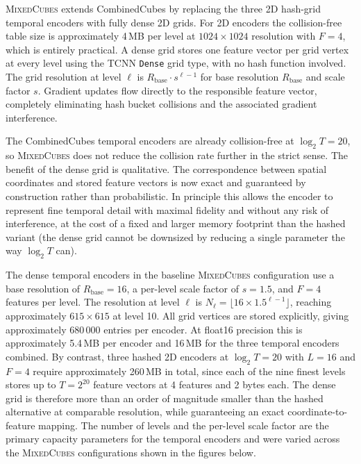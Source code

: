 \documentclass[12pt, a4paper, twoside]{report}
\newcommand{\MixedCubes}{\textsc{MixedCubes}}
\begin{document}
\MixedCubes{} extends CombinedCubes by replacing the three 2D hash-grid temporal encoders with fully dense 2D grids. For 2D encoders the collision-free table size is approximately 4\,MB per level at $1024 \times 1024$ resolution with $F = 4$, which is entirely practical. A dense grid stores one feature vector per grid vertex at every level using the TCNN \texttt{Dense} grid type, with no hash function involved. The grid resolution at level $\ell$ is $R_\text{base} \cdot s^{\ell-1}$ for base resolution $R_\text{base}$ and scale factor $s$. Gradient updates flow directly to the responsible feature vector, completely eliminating hash bucket collisions and the associated gradient interference.

The CombinedCubes temporal encoders are already collision-free at $\log_2 T = 20$, so \MixedCubes{} does not reduce the collision rate further in the strict sense. The benefit of the dense grid is qualitative. The correspondence between spatial coordinates and stored feature vectors is now exact and guaranteed by construction rather than probabilistic. In principle this allows the encoder to represent fine temporal detail with maximal fidelity and without any risk of interference, at the cost of a fixed and larger memory footprint than the hashed variant (the dense grid cannot be downsized by reducing a single parameter the way $\log_2 T$ can).

The dense temporal encoders in the baseline \MixedCubes{} configuration use a base resolution of $R_\text{base} = 16$, a per-level scale factor of $s = 1.5$, and $F = 4$ features per level. The resolution at level $\ell$ is $N_\ell = \lfloor 16 \times 1.5^{\ell-1} \rfloor$, reaching approximately $615 \times 615$ at level 10. All grid vertices are stored explicitly, giving approximately 680\,000 entries per encoder. At float16 precision this is approximately 5.4\,MB per encoder and 16\,MB for the three temporal encoders combined. By contrast, three hashed 2D encoders at $\log_2 T = 20$ with $L = 16$ and $F = 4$ require approximately 260\,MB in total, since each of the nine finest levels stores up to $T = 2^{20}$ feature vectors at 4 features and 2 bytes each. The dense grid is therefore more than an order of magnitude smaller than the hashed alternative at comparable resolution, while guaranteeing an exact coordinate-to-feature mapping. The number of levels and the per-level scale factor are the primary capacity parameters for the temporal encoders and were varied across the \MixedCubes{} configurations shown in the figures below.
\end{document}
